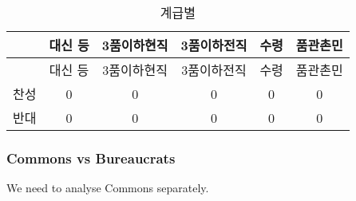 \documentclass[
]{article}
\newenvironment{Shaded}{\begin{snugshade}}{\end{snugshade}}
\newcommand{\DataTypeTok}[1]{\textcolor[rgb]{0.13,0.29,0.53}{#1}}
\newcommand{\DecValTok}[1]{\textcolor[rgb]{0.00,0.00,0.81}{#1}}
\newcommand{\KeywordTok}[1]{\textcolor[rgb]{0.13,0.29,0.53}{\textbf{#1}}}
\newcommand{\NormalTok}[1]{#1}
\newcommand{\OperatorTok}[1]{\textcolor[rgb]{0.81,0.36,0.00}{\textbf{#1}}}
\newcommand{\StringTok}[1]{\textcolor[rgb]{0.31,0.60,0.02}{#1}}
\begin{document}
\begin{longtable}[]{@{}lccccc@{}}
\caption{계급별}\tabularnewline
\toprule
& 대신 등 & 3품이하현직 & 3품이하전직 & 수령 & 품관촌민\tabularnewline
\midrule
\endfirsthead
\toprule
& 대신 등 & 3품이하현직 & 3품이하전직 & 수령 & 품관촌민\tabularnewline
\midrule
\endhead
찬성 & 0 & 0 & 0 & 0 & 0\tabularnewline
반대 & 0 & 0 & 0 & 0 & 0\tabularnewline
\bottomrule
\end{longtable}

\hypertarget{commons-vs-bureaucrats}{%
\subsubsection{Commons vs Bureaucrats}\label{commons-vs-bureaucrats}}

We need to analyse Commons separately.

\begin{Shaded}
\end{Shaded}
\end{document}

